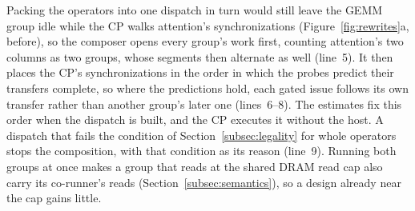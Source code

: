 Packing the operators into one dispatch in turn would still leave the GEMM group idle while the CP walks attention's synchronizations (Figure~\ref{fig:rewrites}a, before), so the composer opens every group's work first, counting attention's two columns as two groups, whose segments then alternate as well (line~5).
It then places the CP's synchronizations in the order in which the probes predict their transfers complete, so where the predictions hold, each gated issue follows its own transfer rather than another group's later one (lines~\mbox{6--8}).
The estimates fix this order when the dispatch is built, and the CP executes it without the host.
A dispatch that fails the condition of Section~\ref{subsec:legality} for whole operators stops the composition, with that condition as its reason (line~9).
Running both groups at once makes a group that reads at the shared DRAM read cap also carry its co-runner's reads (Section~\ref{subsec:semantics}), so a design already near the cap gains little.


